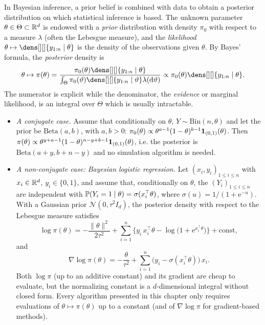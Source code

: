 \documentclass[english,graybox,envcountchap,envcountsame,sectrefs,shortlabels]{svmono}
\theoremstyle{style}
\newcommand{\rme}{\mathrm{e}}
\newcommand{\gauss}{\mathcal{N}}
\newcommand{\eqsp}{}
\begin{document}
\begin{example}
\label{ex:bayes}
In Bayesian inference, a prior belief is combined with data to obtain a posterior distribution on which statistical inference is based. The unknown parameter $\theta\in\Theta\subset\mathbb{R}^d$ is endowed with a \emph{prior} distribution with density $\pi_0$ with respect to a measure $\lambda$ (often the Lebesgue measure), and the \emph{likelihood} $\theta\mapsto \dens[][]{y_{1:n}\mid\theta}$ is the density of the observations given $\theta$. By Bayes' formula, the \emph{posterior} density is
$$
\theta \mapsto \pi(\theta) =\frac{\pi_0( \theta) \dens[][]{ y_{1:n} \mid \theta}}{\int_\Theta \pi_0( \vartheta) \dens[][]{ y_{1:n} \mid \vartheta} \lambda(\rmd \vartheta)} \propto \pi_0( \theta) \dens[][]{ y_{1:n} \mid \theta}\eqsp.
$$
The numerator is explicit while the denominator, the \emph{evidence} or marginal likelihood, is an integral over $\Theta$ which is usually intractable.
\begin{itemize}[-]
\item \emph{A conjugate case.} Assume that conditionally on $\theta$, $Y\sim\mathrm{Bin}(n,\theta)$ and let the prior be $\mathrm{Beta}(a,b)$, with $a,b>0$: $\pi_0(\theta)\propto \theta^{a-1}(1-\theta)^{b-1}\mathbf{1}_{(0,1)}(\theta)$. Then $\pi(\theta)\propto \theta^{y+a-1}(1-\theta)^{n-y+b-1}\mathbf{1}_{(0,1)}(\theta)$, i.e. the posterior is $\mathrm{Beta}(a+y,b+n-y)$ and no simulation algorithm is needed.
\item \emph{A non-conjugate case: Bayesian logistic regression.} Let $(x_i,y_i)_{1\leq i\leq n}$ with $x_i\in\mathbb{R}^d$, $y_i\in\{0,1\}$, and assume that, conditionally on $\theta$, the $(Y_i)_{1\leq i \leq n}$ are independent with $\mathbb{P}(Y_i=1\mid\theta) = \sigma(x_i^\top\theta)$, where $\sigma(u) = 1/(1+\rme^{-u})$. With a Gaussian prior $\gauss(0,\tau^2 I_d)$, the posterior density with respect to the Lebesgue measure satisfies
\begin{equation}
\label{eq:logistic:post}
\log\pi(\theta) = -\frac{\|\theta\|^2}{2\tau^2} + \sum_{i=1}^n \Big\{ y_i\, x_i^\top\theta - \log\big(1+\rme^{x_i^\top\theta}\big)\Big\} + \mathrm{const}\eqsp,
\end{equation}
and
$$
\nabla\log\pi(\theta) = -\frac{\theta}{\tau^2} + \sum_{i=1}^n \big(y_i-\sigma(x_i^\top\theta)\big)\,x_i\eqsp.
$$
Both $\log \pi$ (up to an additive constant) and its gradient are cheap to evaluate, but the normalizing constant is a $d$-dimensional integral without closed form. Every algorithm presented in this chapter only requires evaluations of $\theta\mapsto\pi(\theta)$ up to a constant (and of $\nabla\log\pi$ for gradient-based methods).
\end{itemize}
\end{example}
\end{document}
